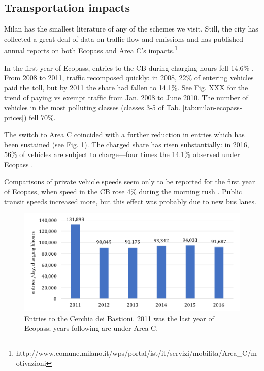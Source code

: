 \subsection{Transportation impacts}

Milan has the smallest literature of any of the schemes we visit. Still, the city has collected a great deal of data on traffic flow and emissions and has published annual reports on both Ecopass and Area C's impacts.\footnote{http://www.comune.milano.it/wps/portal/ist/it/servizi/mobilita/Area\_C/motivazioni}  

In the first year of Ecopass, entries to the CB during charging hours fell 14.6\% \citep[Tab. 2, p. 145]{Croci2015}. From 2008 to 2011, traffic recomposed quickly: in 2008, 22\% of entering vehicles paid the toll, but by 2011 the share had fallen to 14.1\%. See Fig. XXX for the trend of paying vs exempt traffic from Jan. 2008 to June 2010. The number of vehicles in the most polluting classes (classes 3-5 of Tab. \ref{tab:milan-ecopass-prices}) fell 70\%.

The switch to Area C coincided with a further reduction in entries which has been sustained (see Fig. \ref{fig:milan-entries}). The charged share has risen substantially: in 2016, 56\% of vehicles are subject to charge---four times the 14.1\% observed under Ecopass \citep[p. 13]{AMAT2017}.

Comparisons of private vehicle speeds seem only to be reported for the first year of Ecopass, when speed in the CB rose 4\% during the morning rush \citep{AMMA2009}. Public transit speeds increased more, but this effect was probably due to new bus lanes.

\begin{figure}[ht]
	\includegraphics[width=\textwidth]{../img/milan-entries2.png}
	\caption{Entries to the Cerchia dei Bastioni. 2011 was the last year of Ecopass; years following are under Area C. \citep[p. 9]{AMAT2017}}
	\label{fig:milan-entries}
\end{figure}

